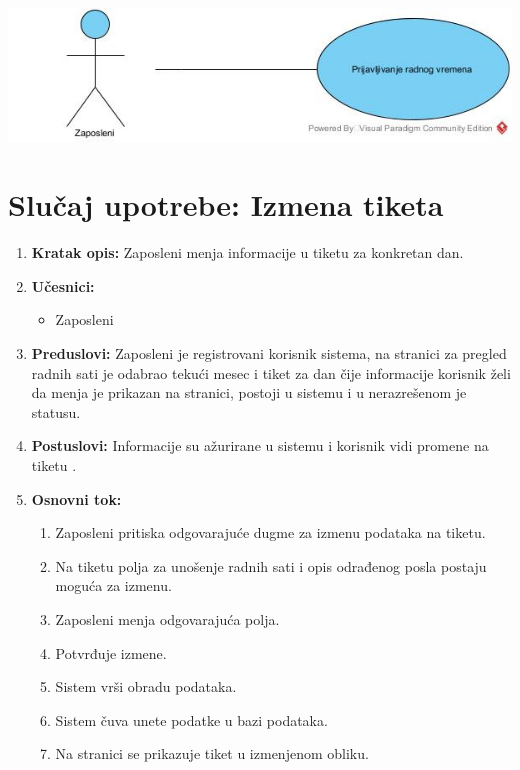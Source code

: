 \documentclass[a4paper]{article}
\begin{document}
\includegraphics[scale=0.5]{PrijavljivanjeRadnogVremena.jpg}





\section{Slučaj upotrebe: Izmena tiketa}
\begin{enumerate}
    \item \textbf{Kratak opis:} Zaposleni menja informacije u tiketu za konkretan dan.
    \item \textbf{Učesnici:}
        \begin{itemize}
            \item Zaposleni
        \end{itemize}
    \item \textbf{Preduslovi:} Zaposleni je registrovani korisnik sistema, na stranici za pregled radnih sati je odabrao tekući mesec i tiket za dan čije informacije korisnik želi da menja je prikazan na stranici, postoji u sistemu i u nerazrešenom je statusu.
    \item \textbf{Postuslovi:} Informacije su ažurirane u sistemu i korisnik vidi promene na tiketu .
    \item \textbf{Osnovni tok:}
        \begin{enumerate}
            \item Zaposleni pritiska odgovarajuće dugme za izmenu podataka na tiketu.
            \item Na tiketu polja za unošenje radnih sati i opis odrađenog posla postaju moguća za izmenu.
            \item Zaposleni menja odgovarajuća polja.
            \item Potvrđuje izmene.
            \item Sistem vrši obradu podataka.
            \item Sistem čuva unete podatke u bazi podataka.
            \item Na stranici se prikazuje tiket u izmenjenom obliku.
        \end{enumerate}

\end{enumerate}
\end{document}
